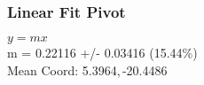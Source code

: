 \documentclass{article}
\begin{document}
		\subsubsection{Linear Fit Pivot}
			\begin{minipage}[h]{0.6\textwidth}
					\begin{center}
						\begingroup{}
			  			\resizebox{\textwidth}{!}{%
							
			  			}\endgroup
					\end{center}
			\end{minipage}
			\begin{minipage}[h]{0.35\textwidth}
				$y=mx$ \\
				m               = 0.22116          +/- 0.03416      (15.44\%) \\

				Mean Coord: 5.3964,\,-20.4486
			\end{minipage}
\end{document}
